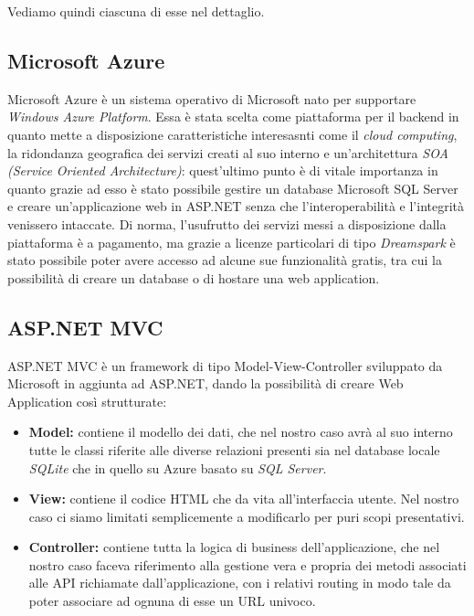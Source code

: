 \documentclass[a4]{book}
\begin{document}
Vediamo quindi ciascuna di esse nel dettaglio. \newline
\subsection{Microsoft Azure}
Microsoft Azure è un sistema operativo di Microsoft nato per supportare \textit{Windows Azure Platform}. Essa è stata scelta come piattaforma per il backend in quanto mette a disposizione caratteristiche interesasnti come il \textit{cloud computing}, la ridondanza geografica dei servizi creati al suo interno e un'architettura \textit{SOA (Service Oriented Architecture)}: quest'ultimo punto è di vitale importanza in quanto grazie ad esso è stato possibile gestire un database Microsoft SQL Server e creare un'applicazione web in ASP.NET senza che l'interoperabilità e l'integrità venissero intaccate.
Di norma, l'usufrutto dei servizi messi a disposizione dalla piattaforma è a pagamento, ma grazie a licenze particolari di tipo \textit{Dreamspark} è stato possibile poter avere accesso ad alcune sue funzionalità gratis, tra cui la possibilità di creare un database o di hostare una web application.

\subsection{ASP.NET MVC}

ASP.NET MVC è un framework di tipo Model-View-Controller sviluppato da Microsoft in aggiunta ad ASP.NET, dando la possibilità di creare Web Application così strutturate:

\begin{itemize}
	\item \textbf{Model:} contiene il modello dei dati, che nel nostro caso avrà al suo interno tutte le classi riferite alle diverse relazioni presenti sia nel database locale \textit{SQLite} che in quello su Azure basato su \textit{SQL Server}.
	\item \textbf{View:} contiene il codice HTML che da vita all'interfaccia utente. Nel nostro caso ci siamo limitati semplicemente a modificarlo per puri scopi presentativi.
	\item \textbf{Controller:} contiene tutta la logica di business dell'applicazione, che nel nostro caso faceva riferimento alla gestione vera e propria dei metodi associati alle API richiamate dall'applicazione, con i relativi routing in modo tale da poter associare ad ognuna di esse un URL univoco.	
\end{itemize}
\end{document}
